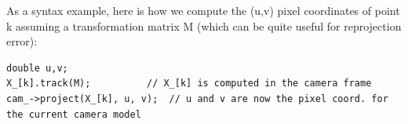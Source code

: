 \documentclass{ecnreport}
\begin{document}
As a syntax example, here is how we compute the (u,v) pixel coordinates of point k assuming a transformation matrix M (which can be quite useful for reprojection error):
 \begin{center}\cppstyle
\begin{lstlisting}
double u,v;
X_[k].track(M);		     // X_[k] is computed in the camera frame
cam_->project(X_[k], u, v);  // u and v are now the pixel coord. for the current camera model
\end{lstlisting}
\end{center}
\end{document}
